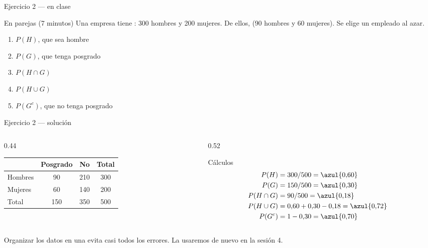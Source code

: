 \documentclass[aspectratio=169,10pt]{beamer}
\begin{document}
\begin{frame}{Ejercicio 2 — en clase}
  \begin{alertblock}{En parejas (7 minutos)}
    Una empresa tiene : 300 hombres y 200 mujeres. De
    ellos,  (90 hombres y 60 mujeres). Se elige
    un empleado al azar.

    \vspace{0.25cm}
    \begin{enumerate}
      \item $P(H)$, que sea hombre
      \item $P(G)$, que tenga posgrado
      \item $P(H\cap G)$
      \item $P(H\cup G)$
      \item $P(G^{c})$, que no tenga posgrado
    \end{enumerate}
  \end{alertblock}
\end{frame}

\begin{frame}{Ejercicio 2 — solución}
  \begin{columns}[T,onlytextwidth]
    \begin{column}{0.44\textwidth}
      \footnotesize
      \begin{center}
      \begin{tabular}{@{}lccc@{}}
        \toprule
         & Posgrado & No & Total \\
        \midrule
        Hombres & 90  & 210 & 300 \\
        Mujeres & 60  & 140 & 200 \\
        \midrule
        Total   & 150 & 350 & 500 \\
        \bottomrule
      \end{tabular}
      \end{center}
    \end{column}
    \begin{column}{0.52\textwidth}
      \begin{block}{Cálculos}
        \small
        \begin{align*}
          P(H) &= 300/500 = \azul{0{,}60}\\
          P(G) &= 150/500 = \azul{0{,}30}\\
          P(H\cap G) &= 90/500 = \azul{0{,}18}\\
          P(H\cup G) &= 0{,}60+0{,}30-0{,}18 = \azul{0{,}72}\\
          P(G^{c}) &= 1-0{,}30 = \azul{0{,}70}
        \end{align*}
      \end{block}
    \end{column}
  \end{columns}

  \vspace{0.1cm}
  {\footnotesize\color{uniGris} Organizar los datos en una  evita casi todos los errores. La usaremos de nuevo en la sesión 4.}
\end{frame}
\end{document}
